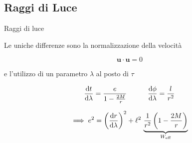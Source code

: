 \subsection{Raggi di Luce}


\begin{frame}{Raggi di luce}

    Le uniche differenze sono la normalizzazione della velocità
    
    \begin{equation*}
        \mathbf{u \cdot u} = 0
    \end{equation*}

    e l'utilizzo di un parametro $\lambda$ al posto di $\tau$

    \begin{equation*}
        \dv{t}{\lambda} = \frac{e}{1 - \frac{2M}{r}} \quad \quad \quad
        \dv{\phi}{\lambda} = \frac{l}{r^2}
    \end{equation*}

    \begin{align*}
        \implies e^2 &= \left( \dv{r}{\lambda} \right)^2 + \ell^2 \,
        \underbrace{\frac{1}{r^2} \left( 1 - \frac{2M}{r} \right)}_{W_{\rm eff}} \\
    \end{align*}

\end{frame}


